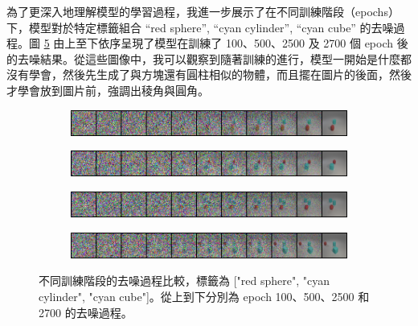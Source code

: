 為了更深入地理解模型的學習過程，我進一步展示了在不同訓練階段（epochs）下，模型對於特定標籤組合 ``red sphere'', ``cyan cylinder'', ``cyan cube'' 的去噪過程。圖 \ref{fig:denoising_process} 由上至下依序呈現了模型在訓練了 100、500、2500 及 2700 個 epoch 後的去噪結果。從這些圖像中，我可以觀察到隨著訓練的進行，模型一開始是什麼都沒有學會，然後先生成了與方塊還有圓柱相似的物體，而且擺在圖片的後面，然後才學會放到圖片前，強調出稜角與圓角。

\begin{figure}[H]
    \centering
    \begin{subfigure}[b]{0.8\textwidth}
        \centering
        \includegraphics[width=\textwidth]{figures/ep100_25.png}
        \label{fig:ep100_25}
    \end{subfigure}
    \vspace{1em}
    \begin{subfigure}[b]{0.8\textwidth}
        \centering
        \includegraphics[width=\textwidth]{figures/ep500_25.png}
        \label{fig:ep500_25}
    \end{subfigure}
    \vspace{1em}
    \begin{subfigure}[b]{0.8\textwidth}
        \centering
        \includegraphics[width=\textwidth]{figures/ep2500_25.png}
        \label{fig:ep2500_25}
    \end{subfigure}
    \vspace{1em}
    \begin{subfigure}[b]{0.8\textwidth}
        \centering
        \includegraphics[width=\textwidth]{figures/ep2700_25.png}
        \label{fig:ep2700_25}
    \end{subfigure}
    \caption{不同訓練階段的去噪過程比較，標籤為 ["red sphere", "cyan cylinder", "cyan cube"]。從上到下分別為 epoch 100、500、2500 和 2700 的去噪過程。}
    \label{fig:denoising_process}
\end{figure}

